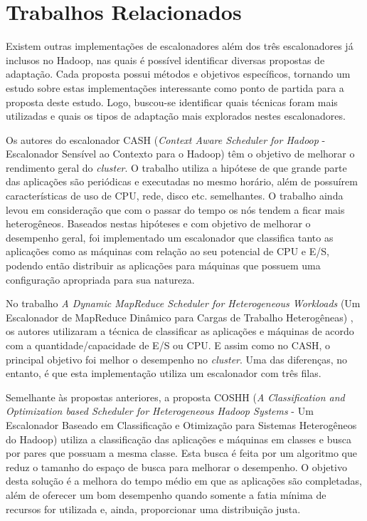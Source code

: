 \section{Trabalhos Relacionados}
Existem outras implementações de escalonadores além dos três escalonadores já inclusos no Hadoop, nas quais é possível identificar diversas propostas de adaptação. Cada proposta possui métodos e objetivos específicos, tornando um estudo sobre estas implementações interessante como ponto de partida para a proposta deste estudo. Logo, buscou-se identificar quais técnicas foram mais utilizadas e quais os tipos de adaptação mais explorados nestes escalonadores. 



Os autores do escalonador CASH (\emph{Context Aware Scheduler for Hadoop} - Escalonador Sensível ao Contexto para o Hadoop) \citet{CASH} têm o objetivo de melhorar o rendimento geral do \emph{cluster}. O trabalho utiliza a hipótese de que grande parte das aplicações são periódicas e executadas no mesmo horário, além de possuírem características de uso de CPU, rede, disco etc. semelhantes. O trabalho ainda levou em consideração que com o passar do tempo os nós tendem a ficar mais heterogêneos. Baseados nestas hipóteses e com objetivo de melhorar o desempenho geral, foi implementado um escalonador que classifica tanto as aplicações como as máquinas com relação ao seu potencial de CPU e E/S, podendo então distribuir as aplicações para máquinas que possuem uma configuração apropriada para sua natureza.

No trabalho \textit{A Dynamic MapReduce Scheduler for Heterogeneous Workloads} (Um Escalonador de MapReduce Dinâmico para Cargas de Trabalho Heterogêneas) \citet{DMRSHW}, os autores utilizaram a técnica de classificar as aplicações e máquinas de acordo com a quantidade/capacidade de E/S ou CPU. E assim como no CASH, o principal objetivo foi melhor o desempenho no \textit{cluster}. Uma das diferenças, no entanto, é que esta implementação utiliza um escalonador com três filas.

Semelhante às propostas anteriores, a proposta COSHH (\textit{A Classification and Optimization based Scheduler for Heterogeneous Hadoop Systems} - Um Escalonador Baseado em Classificação e Otimização para Sistemas Heterogêneos do Hadoop) \citet{COSHH} utiliza a classificação das aplicações e máquinas em classes e busca por pares que possuam a mesma classe. Esta busca é feita por um algoritmo que reduz o tamanho do espaço de busca para melhorar o desempenho. O objetivo desta solução é a melhora do tempo médio em que as aplicações são completadas, além de oferecer um bom desempenho quando somente a fatia mínima de recursos for utilizada e, ainda, proporcionar uma distribuição justa.

